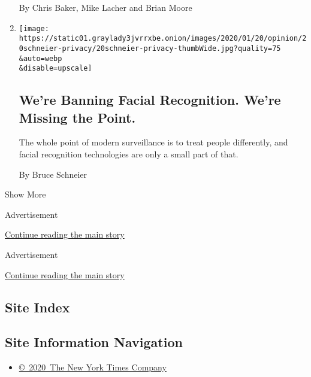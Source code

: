 \begin{enumerate}
  By Chris Baker, Mike Lacher and Brian Moore
\item
  \href{/2020/01/20/opinion/facial-recognition-ban-privacy.html}{}

  \texttt{[image: https://static01.graylady3jvrrxbe.onion/images/2020/01/20/opinion/20schneier-privacy/20schneier-privacy-thumbWide.jpg?quality=75\\\&auto=webp\\\&disable=upscale]}

  \hypertarget{were-banning-facial-recognition-were-missing-the-point}{%
  \subsection{We're Banning Facial Recognition. We're Missing the
  Point.}\label{were-banning-facial-recognition-were-missing-the-point}}

  The whole point of modern surveillance is to treat people differently,
  and facial recognition technologies are only a small part of that.

  By Bruce Schneier
\end{enumerate}

Show More

Advertisement

\protect\hyperlink{after-mid1}{Continue reading the main story}

Advertisement

\protect\hyperlink{after-mktg}{Continue reading the main story}

\hypertarget{site-index}{%
\subsection{Site Index}\label{site-index}}

\hypertarget{site-information-navigation}{%
\subsection{Site Information
Navigation}\label{site-information-navigation}}

\begin{itemize}
\tightlist
\item
  \href{https://help.nytimes3xbfgragh.onion/hc/en-us/articles/115014792127-Copyright-notice}{©~2020~The
  New York Times Company}
\end{itemize}

